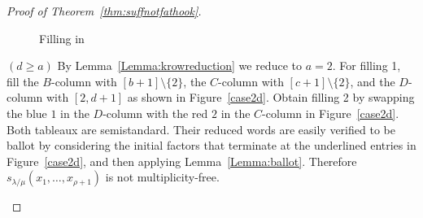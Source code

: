 \begin{proof}[Proof of Theorem~\ref{thm:suffnotfathook}]
\begin{Case}
\begin{figure}[htb]
 \caption[Filling in Case 2.3]{Filling in }
 \label{case2c}
\end{figure}

\end{Case}

\begin{Case}
{ $(d\geq a)$} 
By Lemma~\ref{Lemma:krowreduction} we reduce to $a=2$. For filling 1, fill the $B$-column with $[b+1]\setminus\{2\}$, the $C$-column with $[c+1]\setminus\{2\}$, and the $D$-column with $[2,d+1]$ as shown in Figure~\ref{case2d}. Obtain filling 2 by swapping the blue $1$ in the $D$-column with the red $2$ in the $C$-column in Figure~\ref{case2d}. Both tableaux are semistandard. Their reduced words are easily verified to be ballot by considering the initial factors that terminate at the underlined entries in Figure~\ref{case2d}, and then applying Lemma~\ref{Lemma:ballot}. Therefore $s_{\lambda/\mu}(x_1,\ldots,x_{\rho+1})$ is not multiplicity-free.

\begin{figure}[htb]\centering
\end{figure}
\end{Case}
\end{proof}
